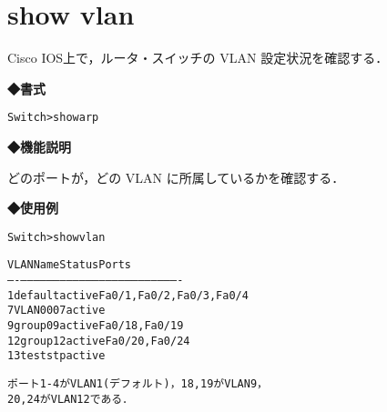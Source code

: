 \section{show vlan}
\label{cmd:ios-vlan}
Cisco IOS上で，ルータ・スイッチの VLAN 設定状況を確認する．

\noindent
{\bf ◆書式}
\begin{center}
\begin{screen}
\begin{alltt}
Switch>show arp

\end{alltt}
\end{screen}
\end{center}


{\bf ◆機能説明}

どのポートが，どの VLAN に所属しているかを確認する．

{\bf ◆使用例}
\begin{center}
\begin{breakbox}
\begin{alltt}
Switch>show vlan

VLAN Name                             Status    Ports
---- -------------------------------- --------- -------------------------------
1    default                          active    Fa0/1, Fa0/2, Fa0/3, Fa0/4
7    VLAN0007                         active
9    group09                          active    Fa0/18, Fa0/19
12   group12                          active    Fa0/20, Fa0/24
13   teststp                          active

ポート1-4 が VLAN 1 (デフォルト)，18,19 が VLAN 9，
20, 24 が VLAN 12 である．
\end{alltt}
\end{breakbox}
\end{center}
                

